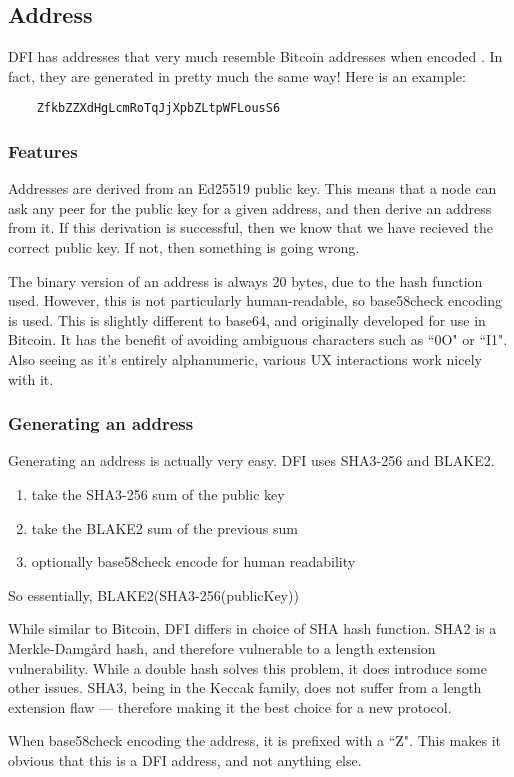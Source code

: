 \subsection{Address}
DFI has addresses that very much resemble Bitcoin addresses when encoded \cite{bitcoin}. In
fact, they are generated in pretty much the same way! Here is an example:
\begin{lstlisting}
	ZfkbZZXdHgLcmRoTqJjXpbZLtpWFLousS6
\end{lstlisting}

	\subsubsection{Features}
\begin{multicols}{2}
Addresses are derived from an Ed25519 public key. This means that a node can ask
any peer for the public key for a given address, and then derive an address from
it. If this derivation is successful, then we know that we have recieved the
correct public key. If not, then something is going wrong.

The binary version of an address is always 20 bytes, due to the hash function
used. However, this is not particularly human-readable, so base58check encoding
is used. This is slightly different to base64, and originally developed for use
in Bitcoin. It has the benefit of avoiding ambiguous characters such as ``0O" or
``I1". Also seeing as it's entirely alphanumeric, various UX interactions work
nicely with it.
\end{multicols}
\subsubsection{Generating an address}
\begin{multicols}{2}
Generating an address is actually very easy. DFI uses SHA3-256 and BLAKE2.
\begin{enumerate}
	\item take the SHA3-256 sum of the public key
	\item take the BLAKE2 sum of the previous sum
	\item optionally base58check encode for human readability
\end{enumerate}
So essentially, BLAKE2(SHA3-256(publicKey))

While similar to Bitcoin, DFI differs in choice of SHA hash function. SHA2 is a
Merkle-Damg\aa{}rd hash, and therefore vulnerable to a length
extension vulnerability. While a double hash solves this problem, it does
introduce some other issues. SHA3, being in the Keccak family, does not suffer
from a length extension flaw \cite{length} --- therefore making it the best choice for a new
protocol.

When base58check encoding the address, it is prefixed with a ``Z". This makes it
obvious that this is a DFI address, and not anything else. 
\end{multicols}

